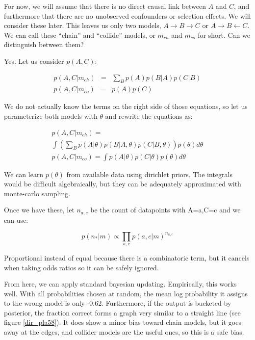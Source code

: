 \documentclass[twocolumn,12pt]{article}
\begin{document}
For now, we will assume that there is no direct causal
link between $A$ and $C$, and furthermore that there are no unobserved
confounders or selection effects.  We will consider these later.
This leaves us only two models, $A \rightarrow B \rightarrow C$ or $A
\rightarrow B \leftarrow C$.  We can call these ``chain'' and
``collide'' models, or $m_{ch}$ and $m_{co}$ for short.  Can we
distinguish between them?

Yes.  Let us consider
$p(A,C)$:

\begin{eqnarray*}
p(A,C|m_{ch}) & = & \sum_B p(A)p(B|A)p(C|B) \\
p(A,C|m_{co}) & = & p(A)p(C)
\end{eqnarray*}

We do not actually know the terms on the right side of those
equations, so let us parameterize both models with $\theta$ and
rewrite the equations as:


\begin{multline*}
  p(A,C|m_{ch}) = \\
  \int \left ( \sum_B p(A|\theta) p(B|A,\theta) 
  p(C|B,\theta) \right ) p(\theta) d\theta \\
  p(A,C|m_{co}) = \int p(A|\theta)p(C|\theta)p(\theta) d\theta
\end{multline*}

We can learn $p(\theta)$ from available data using dirichlet priors.
The integrals would be difficult algebraically, but they can be
adequately approximated with monte-carlo sampling.

Once we have these, let $n_{a,c}$ be the count of datapoints with
A=a,C=c and we can use:

\begin{equation*}
p(n_*|m) \propto \prod_{a,c} p(a,c|m)^{n_{a,c}}
\end{equation*}

Proportional instead of equal because there is a combinatoric term,
but it cancels when taking odds ratios so it can be safely ignored.

From here, we can apply standard bayesian updating.  Empirically, this
works well.  With all probabilities chosen at random, the mean log
probability it assigns to the wrong model is only -0.62.  Furthermore,
if the output is bucketed by posterior, the fraction correct forms a
graph very similar to a straight line (see figure \ref{dir_pla58}).
It does show a minor bias toward chain models, but it goes away at the
edges, and collider models are the useful ones, so this is a safe bias.
\end{document}
